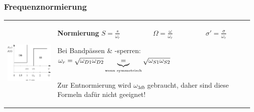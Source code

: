 \subsubsection{Frequenznormierung }
\begin{tabular}{ll}
\parbox{6cm}{
	\includegraphics[width=5cm]{./images/filter-freqnormierung.png}}
& \parbox{12cm}{
	\textbf{Normierung} \\
	$S=\frac{s}{\omega_{r}} \hspace{2cm} \Omega=\frac{\omega}{\omega_{r}} 
\hspace{2cm} \sigma'=\frac{\sigma}{\omega_{r}}$\\ 

	Bei Bandpässen \& -sperren: $\omega_r = \sqrt{\omega_{D1} \omega_{D2}}
	\underbrace{=}_{\text{\tiny{wenn symmetrisch}}} \sqrt{\omega_{S1} \omega_{S2}}$
	\\

	Zur Entnormierung wird $\omega_{3db}$ gebraucht, daher sind diese Formeln
	dafür nicht geeignet! \\
	}
\end{tabular}

